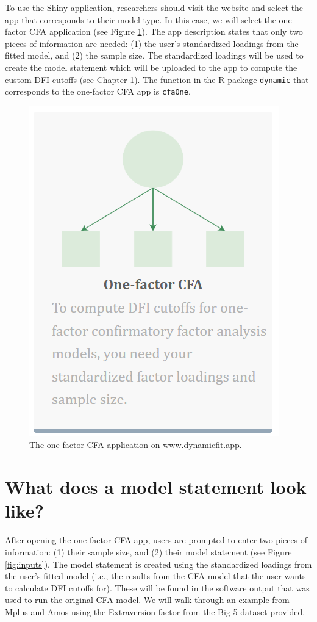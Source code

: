 \documentclass[
]{book}
\begin{document}
To use the Shiny application, researchers should visit the website and select the app that corresponds to their model type. In this case, we will select the one-factor CFA application (see Figure \ref{fig:one}). The app description states that only two pieces of information are needed: (1) the user's standardized loadings from the fitted model, and (2) the sample size. The standardized loadings will be used to create the model statement which will be uploaded to the app to compute the custom DFI cutoffs (see Chapter \ref{model}). The function in the R package \texttt{dynamic} that corresponds to the one-factor CFA app is \texttt{cfaOne}.

\begin{figure}

{\centering \includegraphics[width=0.4\linewidth]{one factor app} 

}

\caption{The one-factor CFA application on www.dynamicfit.app.}\label{fig:one}
\end{figure}

\hypertarget{model}{%
\chapter{What does a model statement look like?}\label{model}}

After opening the one-factor CFA app, users are prompted to enter two pieces of information: (1) their sample size, and (2) their model statement (see Figure \ref{fig:inputs}). The model statement is created using the standardized loadings from the user's fitted model (i.e., the results from the CFA model that the user wants to calculate DFI cutoffs for). These will be found in the software output that was used to run the original CFA model. We will walk through an example from Mplus and Amos using the Extraversion factor from the Big 5 dataset provided.
\end{document}
